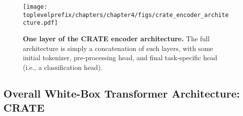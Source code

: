 \documentclass[\toplevelprefix/book-main.tex]{subfiles}
\begin{document}

\begin{figure}
     \centering
     \texttt{[image: \\toplevelprefix/chapters/chapter4/figs/crate\_encoder\_architecture.pdf]}
    \caption{\small \textbf{One layer of the CRATE encoder architecture.} The full architecture is simply a concatenation of such layers, with some initial tokenizer, pre-processing head, and final task-specific head (i.e., a classification head).}
    \label{fig:arch-crate}
\end{figure}



\subsection{Overall White-Box Transformer Architecture: CRATE}
\end{document}
